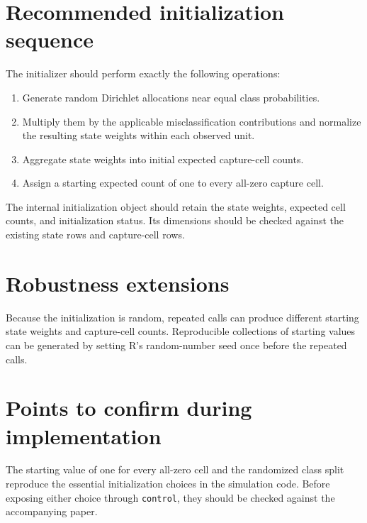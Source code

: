 \documentclass[11pt,a4paper]{article}
\begin{document}
\section{Recommended initialization sequence}

The initializer should perform exactly the following operations:
\begin{enumerate}
  \item Generate random Dirichlet allocations near equal class probabilities.
  \item Multiply them by the applicable misclassification contributions and
        normalize the resulting state weights within each observed unit.
  \item Aggregate state weights into initial expected capture-cell counts.
  \item Assign a starting expected count of one to every all-zero capture cell.
\end{enumerate}

The internal initialization object should retain the state weights, expected
cell counts, and initialization status. Its dimensions should be checked
against the existing state rows and capture-cell rows.

\section{Robustness extensions}

Because the initialization is random, repeated calls can produce different
starting state weights and capture-cell counts. Reproducible collections of
starting values can be generated by setting R's random-number seed once before
the repeated calls.

\section{Points to confirm during implementation}

The starting value of one for every all-zero cell and the randomized class
split reproduce the essential initialization choices in the simulation code.
Before exposing either choice through \texttt{control}, they should be checked
against the accompanying paper.
\end{document}
